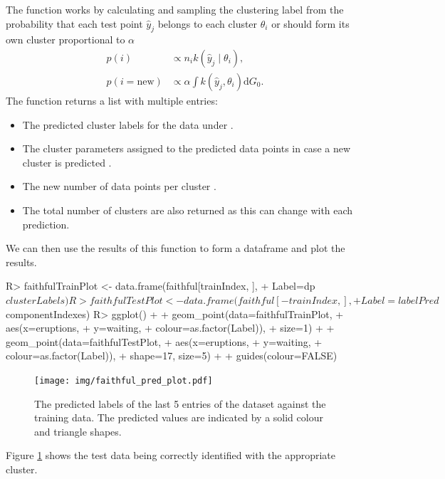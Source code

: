 \documentclass[nojss]{jss}
\begin{document}
The function  works by calculating and sampling the clustering label from the probability that each test point $\hat{y} _j$ belongs to each cluster $\theta _i$ or should form its own cluster proportional to $\alpha$
\begin{align*}
p(i) & \propto n_i k(\hat{y} _j \mid \theta _i), \\
p(i=\text{new}) & \propto \alpha \int k(\hat{y} _j , \theta _i) \mathrm{d} G_0.
\end{align*}
The function returns a list with multiple entries:
\begin{itemize}
\item The predicted cluster labels for the data under .
\item The cluster parameters assigned to the predicted data points in case a new cluster is predicted .
\item The new number of data points per cluster .
\item The total number of clusters are also returned  as this can change with each prediction.
\end{itemize}


We can then use the results of this function to form a dataframe and plot the results.

\begin{Schunk}
\begin{Sinput}
R> faithfulTrainPlot <- data.frame(faithful[trainIndex, ],
+                                  Label=dp$clusterLabels)
R> faithfulTestPlot <- data.frame(faithful[-trainIndex, ],
+                                 Label=labelPred$componentIndexes)
R> ggplot() +
+      geom_point(data=faithfulTrainPlot,
+                 aes(x=eruptions,
+                     y=waiting,
+                     colour=as.factor(Label)),
+                 size=1) +
+      geom_point(data=faithfulTestPlot,
+                 aes(x=eruptions,
+                     y=waiting,
+                     colour=as.factor(Label)),
+                 shape=17, size=5) +
+    guides(colour=FALSE)
\end{Sinput}
\end{Schunk}


\begin{figure}[tb]
\centering
	\texttt{[image: img/faithful\_pred\_plot.pdf]}
\caption{The predicted labels of the last 5 entries of the  dataset against the training data. The predicted values are indicated by a solid colour and triangle shapes.}
\label{fig:faithfulpred}
\end{figure}
Figure \ref{fig:faithfulpred} shows the test data being correctly identified with the appropriate cluster.
\end{document}
